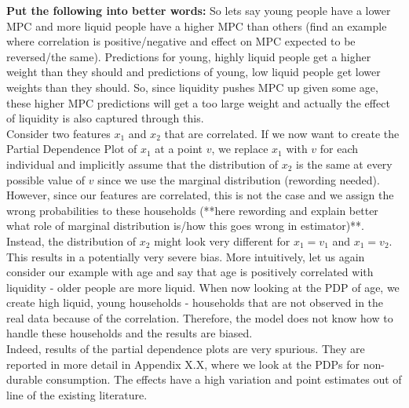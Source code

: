 \textbf{Put the following into better words:}
So lets say young people have a lower MPC and more liquid people have a higher MPC than others (find an example where correlation is positive/negative and effect on MPC expected to be reversed/the same). Predictions for young, highly liquid people get a higher weight than they should and predictions of young, low liquid people get lower weights than they should. So, since liquidity pushes MPC up given some age, these higher MPC predictions will get a too large weight and actually the effect of liquidity is also captured through this. \\
Consider two features $x_1$ and $x_2$ that are correlated. If we now want to create the Partial Dependence Plot of $x_1$ at a point $v$, we replace $x_1$ with $v$ for each individual and implicitly assume that the distribution of $x_2$ is the same at every possible value of $v$ since we use the marginal distribution (rewording needed). However, since our features are correlated, this is not the case and we assign the wrong probabilities to these households (**here rewording and explain better what role of marginal distribution is/how this goes wrong in estimator)**. Instead, the distribution of $x_2$ might look very different for $x_1=v_1$ and $x_1=v_2$. This results in a potentially very severe bias. More intuitively, let us again consider our example with age and say that age is positively correlated with liquidity - older people are more liquid. When now looking at the PDP of age, we create high liquid, young households - households that are not observed in the real data because of the correlation. Therefore, the model does not know how to handle these households and the results are biased. \\
Indeed, results of the partial dependence plots are very spurious. They are reported in more detail in Appendix X.X, where we look at the PDPs for non-durable consumption. The effects have a high variation and point estimates out of line of the existing literature. 

